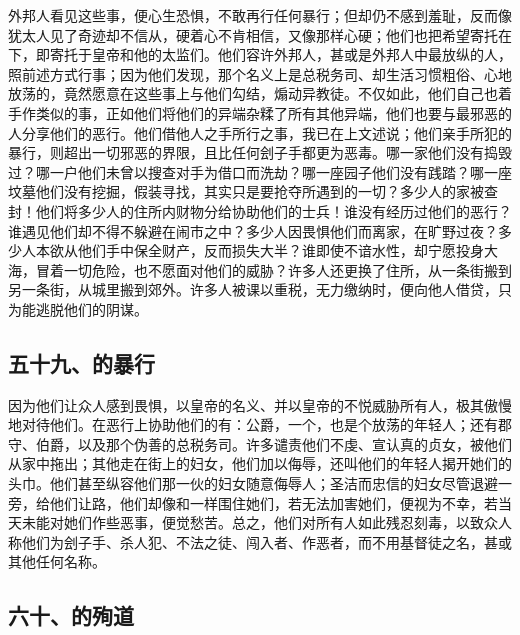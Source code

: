 外邦人看见这些事，便心生恐惧，不敢再行任何暴行；但却仍不感到羞耻，反而像犹太人见了奇迹却不信从，硬着心不肯相信，又像那样心硬；他们也把希望寄托在下，即寄托于皇帝和他的太监们。他们容许外邦人，甚或是外邦人中最放纵的人，照前述方式行事；因为他们发现，那个名义上是总税务司、却生活习惯粗俗、心地放荡的，竟然愿意在这些事上与他们勾结，煽动异教徒。不仅如此，他们自己也着手作类似的事，正如他们将他们的异端杂糅了所有其他异端，他们也要与最邪恶的人分享他们的恶行。他们借他人之手所行之事，我已在上文述说；他们亲手所犯的暴行，则超出一切邪恶的界限，且比任何刽子手都更为恶毒。哪一家他们没有捣毁过？哪一户他们未曾以搜查对手为借口而洗劫？哪一座园子他们没有践踏？哪一座坟墓他们没有挖掘，假装寻找，其实只是要抢夺所遇到的一切？多少人的家被查封！他们将多少人的住所内财物分给协助他们的士兵！谁没有经历过他们的恶行？谁遇见他们却不得不躲避在闹市之中？多少人因畏惧他们而离家，在旷野过夜？多少人本欲从他们手中保全财产，反而损失大半？谁即使不谙水性，却宁愿投身大海，冒着一切危险，也不愿面对他们的威胁？许多人还更换了住所，从一条街搬到另一条街，从城里搬到郊外。许多人被课以重税，无力缴纳时，便向他人借贷，只为能逃脱他们的阴谋。\par


\subsection{五十九、的暴行}

因为他们让众人感到畏惧，以皇帝的名义、并以皇帝的不悦威胁所有人，极其傲慢地对待他们。在恶行上协助他们的有：公爵，一个，也是个放荡的年轻人；还有郡守、伯爵，以及那个伪善的总税务司。许多谴责他们不虔、宣认真的贞女，被他们从家中拖出；其他走在街上的妇女，他们加以侮辱，还叫他们的年轻人揭开她们的头巾。他们甚至纵容他们那一伙的妇女随意侮辱人；圣洁而忠信的妇女尽管退避一旁，给他们让路，他们却像和一样围住她们，若无法加害她们，便视为不幸，若当天未能对她们作些恶事，便觉愁苦。总之，他们对所有人如此残忍刻毒，以致众人称他们为刽子手、杀人犯、不法之徒、闯入者、作恶者，而不用基督徒之名，甚或其他任何名称。\par


\subsection{六十、的殉道}

